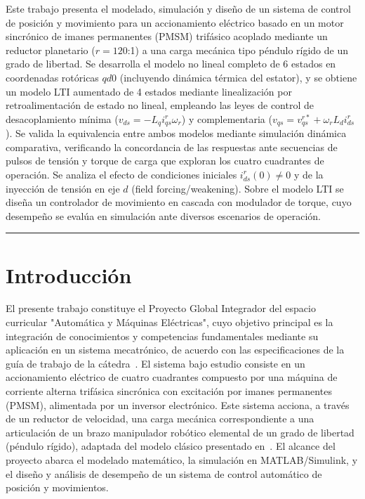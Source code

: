 \documentclass[12pt, a4paper,journal, onecolumn, compsoc]{IEEEtran}
\begin{document}
\noindent Este trabajo presenta el modelado, simulación y diseño de un sistema de control de posición y movimiento para un accionamiento eléctrico basado en un motor sincrónico de imanes permanentes (PMSM) trifásico acoplado mediante un reductor planetario ($r = 120$:1) a una carga mecánica tipo péndulo rígido de un grado de libertad. Se desarrolla el modelo no lineal completo de 6 estados en coordenadas rotóricas $qd0$ (incluyendo dinámica térmica del estator), y se obtiene un modelo LTI aumentado de 4 estados mediante linealización por retroalimentación de estado no lineal, empleando las leyes de control de desacoplamiento mínima ($v_{ds} = -L_q i_{qs}^r \omega_r$) y complementaria ($v_{qs} = v_{qs}^{r*} + \omega_r L_d i_{ds}^r$). Se valida la equivalencia entre ambos modelos mediante simulación dinámica comparativa, verificando la concordancia de las respuestas ante secuencias de pulsos de tensión y torque de carga que exploran los cuatro cuadrantes de operación. Se analiza el efecto de condiciones iniciales $i_{ds}^r(0) \neq 0$ y de la inyección de tensión en eje $d$ (field forcing/weakening). Sobre el modelo LTI se diseña un controlador de movimiento en cascada con modulador de torque, cuyo desempeño se evalúa en simulación ante diversos escenarios de operación.

\vspace{4pt}
\noindent\rule{\textwidth}{0.4pt}

\section{Introducción}
El presente trabajo constituye el Proyecto Global Integrador del espacio curricular "Automática y Máquinas Eléctricas", cuyo objetivo principal es la integración de conocimientos y competencias fundamentales mediante su aplicación en un sistema mecatrónico, de acuerdo con las especificaciones de la guía de trabajo de la cátedra~\cite{guia_trabajo}.
El sistema bajo estudio consiste en un accionamiento eléctrico de cuatro cuadrantes compuesto por una máquina de corriente alterna trifásica sincrónica con excitación por imanes permanentes (PMSM), alimentada por un inversor electrónico. Este sistema acciona, a través de un reductor de velocidad, una carga mecánica correspondiente a una articulación de un brazo manipulador robótico elemental de un grado de libertad (péndulo rígido), adaptada del modelo clásico presentado en~\cite{kelly_robot}.
El alcance del proyecto abarca el modelado matemático, la simulación en MATLAB/Simulink, y el diseño y análisis de desempeño de un sistema de control automático de posición y movimientos.
\end{document}
